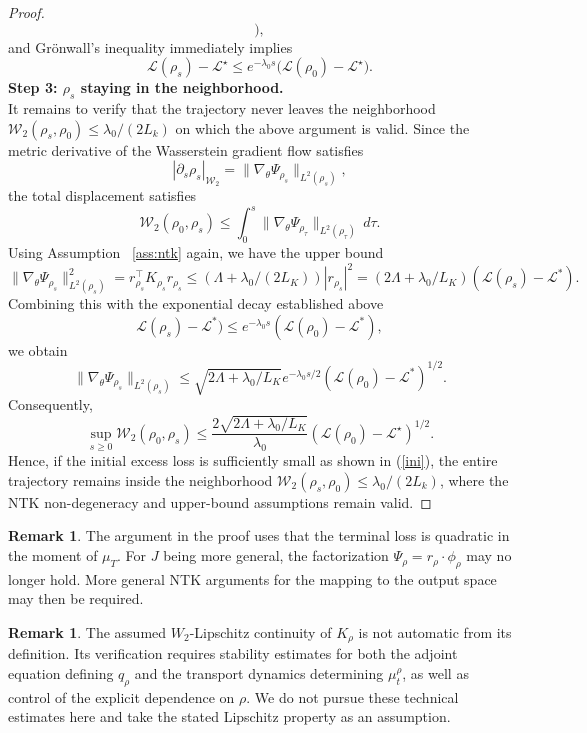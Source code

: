 \documentclass[11pt,a4wide]{article}
\theoremstyle{definition}
\newtheorem{remark}[theorem]{Remark}
\newcommand{\Wass}{\mathcal{W}}
\begin{document}
\begin{proof}
\[\bigr),
\]
and Gr\"onwall's inequality immediately implies
\[
\mathcal L(\rho_s)-\mathcal L^\star
\le
e^{-\lambda_0 s}
\bigl(
\mathcal L(\rho_0)-\mathcal L^\star
\bigr).
\]
{\bf Step 3: $\rho_s$ staying in the neighborhood.}\\
It remains to verify that the trajectory never leaves the neighborhood
$\Wass_2(\rho_s,\rho_0)\le \lambda_0/(2L_k)$ on which the above argument is valid.
Since the metric derivative of the Wasserstein gradient flow satisfies
\[
|\partial_s  \rho_s|_{\Wass_2}
=
\|
\nabla_\theta\Psi_{\rho_s}
\|_{L^2(\rho_s)},
\]
the total displacement satisfies
\[
\Wass_2(\rho_0,\rho_s)
\le
\int_0^s
\|
\nabla_\theta\Psi_{\rho_\tau}
\|_{L^2(\rho_\tau)}
\,d\tau.
\]
Using Assumption ~\ref{ass:ntk} again,  we have the upper bound 
$$
\|\nabla_\theta \Psi_{\rho_s}\|^2_{L^2(\rho_s)}= r_{\rho_s}^\top K_{\rho_s} r_{\rho_s} \leq (\Lambda +\lambda_0/(2L_K))  |r_{\rho_s}|^2 
=(2 \Lambda+\lambda_0/L_K) ( \mathcal L(\rho_s)-\mathcal L^*).
$$
Combining this with the exponential decay established above 
$$
 \mathcal L(\rho_s)-\mathcal L^*)  \leq  e^{-\lambda_0 s} ( \mathcal L(\rho_0)-\mathcal L^*),
$$
we obtain %
$$
\|\nabla_\theta \Psi_{\rho_s}\|_{L^2(\rho_s)}
\leq \sqrt{2\Lambda +\lambda_0/L_K} e^{-\lambda_0 s/2} ( \mathcal L(\rho_0)-\mathcal L^*)^{1/2}. 
$$
Consequently,  
\[
\sup_{s\ge0}
\Wass_2(\rho_0,\rho_s)
\le
\frac{2\sqrt{2\Lambda +\lambda_0/L_K} }{\lambda_0}
(\mathcal L(\rho_0)-\mathcal L^\star)^{1/2}.
\]
Hence, if the initial excess loss is sufficiently small as shown in (\ref{ini}),  the entire trajectory remains inside the neighborhood $\Wass_2(\rho_s,\rho_0)\le \lambda_0/(2L_k)$, 
where  the NTK non-degeneracy and upper-bound assumptions remain valid.
\end{proof}

\begin{remark} 
The argument in the proof uses that the terminal loss is quadratic in the moment of $\mu_T$.  For $J$ being  more general,   the factorization $\Psi_\rho=r_\rho \cdot  \phi_\rho$ may no longer hold. More general NTK arguments for the mapping to the output space may then be required. 
\end{remark}

\begin{remark} 
The assumed $W_2$-Lipschitz continuity of $K_\rho$ is not automatic from its definition. Its verification requires stability estimates for both the adjoint equation defining $q_\rho$ and the transport dynamics determining $\mu_t^\rho$, as well as control of the explicit dependence on $\rho$. We do not pursue these technical estimates here and take the stated Lipschitz property as an assumption.
\end{remark}
\end{document}
